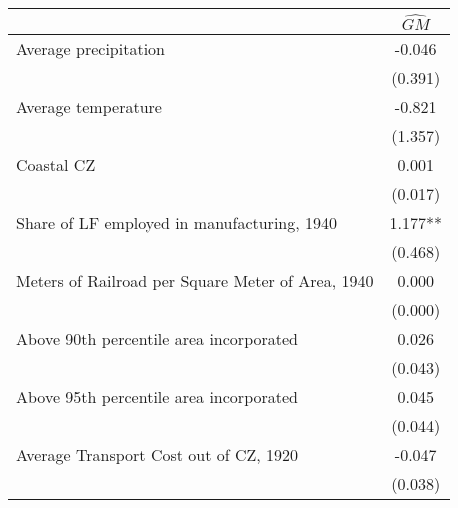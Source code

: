  \begin{tabular}{l*{1}{c}} \toprule
                &\multicolumn{1}{c}{$\widehat{GM}$}\\
\midrule
Average precipitation&   -0.046   \\
                &  (0.391)   \\
\addlinespace
Average temperature&   -0.821   \\
                &  (1.357)   \\
\addlinespace
Coastal CZ      &    0.001   \\
                &  (0.017)   \\
\addlinespace
Share of LF employed in manufacturing, 1940&    1.177** \\
                &  (0.468)   \\
\addlinespace
Meters of Railroad per Square Meter of Area, 1940&    0.000   \\
                &  (0.000)   \\
\addlinespace
Above 90th percentile area incorporated&    0.026   \\
                &  (0.043)   \\
\addlinespace
Above 95th percentile area incorporated&    0.045   \\
                &  (0.044)   \\
\addlinespace
Average Transport Cost out of CZ, 1920&   -0.047   \\
                &  (0.038)   \\
       \bottomrule \end{tabular}
